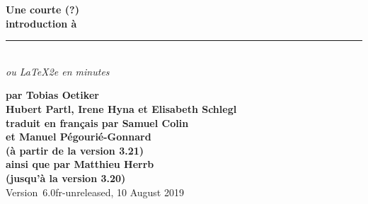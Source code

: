 

\ifpdf
\fi
\newlength{\centeroffset}
\setlength{\centeroffset}{-0.5\oddsidemargin}
\addtolength{\centeroffset}{0.5\evensidemargin}
\addtolength{\textwidth}{-\centeroffset}
\thispagestyle{empty}
\noindent\hspace*{\centeroffset}%
\begin{minipage}{\textwidth}
\parindent=0pt
\flushright
{\Huge\bfseries Une courte (?)\\ 
introduction à \LaTeXe}\\
\rule[-1ex]{\textwidth}{5pt}\\[2.5ex]
\emph{\Large ou \LaTeX2e en \pageref{LastPage} minutes}\\[2ex]
\end{minipage}

\noindent\hspace*{\centeroffset}\begin{minipage}{\textwidth}
\flushright
{\bfseries 
par Tobias Oetiker\\[1.5ex]
Hubert Partl, Irene Hyna et  Elisabeth Schlegl\\[1.5ex]
traduit en français par Samuel Colin\\
  et Manuel Pégourié-Gonnard\\
(à partir de la version 3.21)\\[3ex]
ainsi que par Matthieu Herrb\\
(jusqu'à la version 3.20)\\[3ex]}
Version~6.0fr-unreleased, 10 August 2019
\end{minipage}
\addtolength{\textwidth}{\centeroffset}


\pagebreak

\endinput


%

